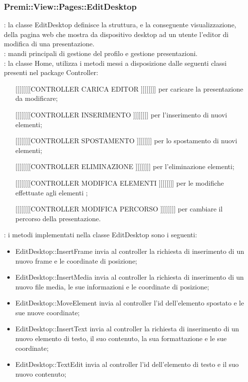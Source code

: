 {		\subsubsection{Premi::View::Pages::EditDesktop}{
			\textbf{\tipo}: la classe EditDesktop definisce la struttura, e la conseguente visualizzazione, della pagina web che mostra da dispositivo desktop ad un utente  l'editor di modifica di una presentazione.\\
			\textbf{\relaz}: mandi principali di gestione del profilo e gestione presentazioni.\\	
			\textbf{\relaz}: la classe Home, utilizza i metodi messi a disposizione dalle seguenti classi presenti nel package Controller:
			\begin{itemize}
				\item [[[[[[[[[CONTROLLER CARICA EDITOR]]]]]]]]] per caricare la presentazione da modificare;
				\item [[[[[[[[[CONTROLLER INSERIMENTO]]]]]]]]] per l'inserimento di nuovi elementi;
				\item [[[[[[[[[CONTROLLER SPOSTAMENTO]]]]]]]]] per lo spostamento di nuovi elementi;
				\item [[[[[[[[[CONTROLLER ELIMINAZIONE]]]]]]]]] per l'eliminazione elementi;
				\item [[[[[[[[[CONTROLLER MODIFICA ELEMENTI]]]]]]]]] per le modifiche  effettuate agli elementi ;
				\item [[[[[[[[[CONTROLLER MODIFICA PERCORSO]]]]]]]]] per cambiare il percorso della presentazione.
			\end{itemize}
			\textbf{\interfacce}: i metodi implementati nella classe EditDesktop sono i seguenti:
			\begin{itemize}
				\item EditDesktop::InsertFrame invia al controller la richiesta di inserimento di un nuovo frame e le coordinate di posizione;
				\item EditDesktop::InsertMedia invia al controller la richiesta di inserimento di un nuovo file media, le sue informazioni e le coordinate di posizione;
				\item EditDesktop::MoveElement invia al controller l'id dell'elemento spostato e le sue nuove coordinate;
				\item EditDesktop::InsertText invia al controller la richiesta di inserimento di un nuovo elemento di testo, il suo contenuto, la sua formattazione e le sue coordinate;
				\item EditDesktop::TextEdit invia al controller l'id dell'elemento di testo e il suo nuovo contenuto;

\end{itemize}}}
